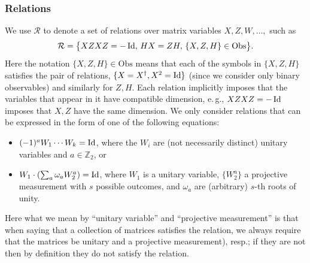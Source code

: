 \documentclass[11pt]{article}
\numberwithin{equation}{section}
\theoremstyle{definition}
\theoremstyle{plain}
\newcommand{\Z}{\mathbb Z}
\newcommand{\eg}{e.\,g.}
\newcommand{\Id}{\ensuremath{\mathop{\rm Id}\nolimits}}
\newcommand{\setft}[1]{\mathrm{#1}}
\newcommand{\Obs}{\setft{Obs}}
\begin{document}
\subsubsection{Relations}

We use $\mathcal{R}$ to denote a set of relations over matrix variables $X,Z,W,\ldots,$ such as
$$\mathcal{R}=\big\{XZXZ=-\Id,\, HX=ZH,\,\{X,Z,H\}\in\Obs\big\}.$$
Here the notation $\{X,Z,H\}\in\Obs$ means that each of the symbols in $\{X,Z,H\}$ satisfies the pair of relations, $\{X=X^\dagger,X^2=\Id\}$ (since we consider only binary observables) and similarly for $Z,H$. Each relation implicitly imposes that the variables that appear in it have compatible dimension, 
\eg, $XZXZ=-\Id$ imposes that $X,Z$ have the same dimension. 
We only consider relations that can be expressed in the form of  one of the following
equations:
\begin{itemize}
  \item  $(-1)^a W_1\cdots W_k = \Id$, where the $W_i$ are (not necessarily distinct) unitary variables and $a\in\Z_2$, or
  \item $ W_1 \cdot ( \sum_a \omega_a W_2^a)=\Id$, where $W_1$ is a unitary variable, $\{W_2^a\}$ a projective measurement with $s$ possible outcomes, and $\omega_a$ are (arbitrary) $s$-th roots of unity.
\end{itemize}
Here what we mean by ``unitary variable''
%
%
and ``projective measurement''  %
is that when saying that a collection of matrices %
satisfies  %
the relation, we always require that the matrices %
be  %
%
unitary and a projective measurement), resp.; %
if they are not then by definition they do not satisfy the relation. 
\end{document}
